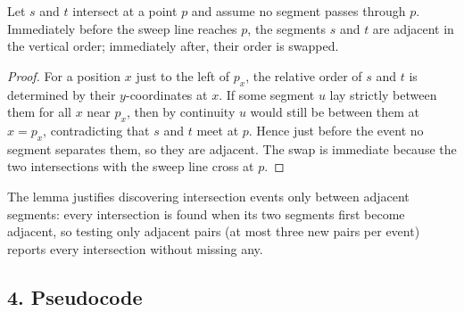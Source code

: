 \begin{lemma}\label{thm:segint_adjacent_swap}
  Let $s$ and $t$ intersect at a point $p$ and assume no segment passes
  through $p$. Immediately before the sweep line reaches $p$, the segments
  $s$ and $t$ are adjacent in the vertical order; immediately after, their
  order is swapped.
\end{lemma}

\begin{proof}
  For a position $x$ just to the left of $p_x$, the relative order of $s$
  and $t$ is determined by their $y$-coordinates at $x$. If some segment $u$
  lay strictly between them for all $x$ near $p_x$, then by continuity $u$
  would still be between them at $x = p_x$, contradicting that $s$ and $t$
  meet at $p$. Hence just before the event no segment separates them, so they
  are adjacent. The swap is immediate because the two intersections with the
  sweep line cross at $p$.
\end{proof}

The lemma justifies discovering intersection events only between adjacent
segments: every intersection is found when its two segments first become
adjacent, so testing only adjacent pairs (at most three new pairs per
event) reports every intersection without missing any.

\subsection{4. Pseudocode}

